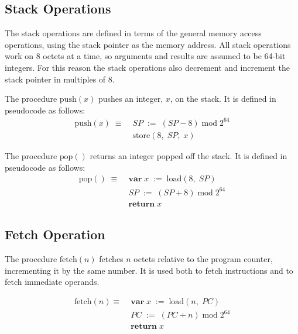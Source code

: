 \documentclass[a4paper,10pt]{article}
\newcommand{\PC}{PC}
\newcommand{\SP}{SP}
\newcommand{\set}[2]{#1\;:=\;#2}
\newcommand{\Var}[2]{\mathbf{var}\;#1\;:=\;#2\;}
\newcommand{\return}[1]{\mathbf{return} \; #1}
\newcommand{\Put}[3]{\mathrm{store}(#1,\;#2,\;#3)}
\newcommand{\Get}[2]{\mathrm{load}(#1,\;#2)}
\newcommand{\Push}[1]{\mathrm{push}(#1)}
\newcommand{\Pop}{\mathrm{pop}()}
\newcommand{\Fetch}[1]{\mathrm{fetch}(#1)}
\DeclareMathOperator{\Mod}{mod}
\newcommand{\modulo}[2]{#1 \Mod #2}
\theoremstyle{definition}
\begin{document}
\subsection{Stack Operations}

The stack operations are defined in terms of the general memory access operations, using the stack pointer as the memory address.
All stack operations work on 8 octets at a time, so arguments and results are assumed to be 64-bit integers.
For this reason the stack operations also decrement and increment the stack pointer in multiples of 8.

The procedure $\Push{x}$ pushes an integer, $x$, on the stack.
It is defined in pseudocode as follows:
\begin{equation}
  \begin{split}
    \Push{x} \; \equiv \; & \set{\SP}{\modulo{(\SP-8)}{2^{64}}} \\
                       & \Put{8}{\SP}{x}
  \end{split}
\end{equation}

The procedure $\Pop{}$ returns an integer popped off the stack.
It is defined in pseudocode as follows:
\begin{equation}
  \begin{split}
    \Pop{} \; \equiv \; & \Var{x}{\Get{8}{\SP}} \\
    & \set{\SP}{\modulo{(\SP+8)}{2^{64}}} \\
    & \return{x}
  \end{split}
\end{equation}

\subsection{Fetch Operation}

The procedure $\Fetch{n}$ fetches $n$ octets relative to the program counter, incrementing it by the same number.
It is used both to fetch instructions and to fetch immediate operands.

\begin{equation}
  \begin{split}
    \Fetch{n} \equiv \; & \Var{x}{\Get{n}{\PC}} \\
    & \set{\PC}{\modulo{(\PC+n)}{2^{64}}} \\
    & \return{x}
  \end{split}
\end{equation}
\end{document}
